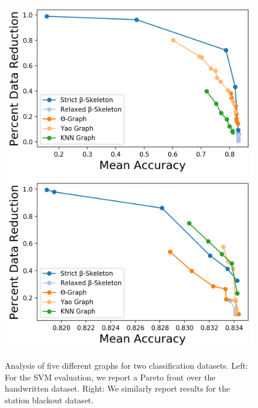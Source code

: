 \begin{figure}
    \includegraphics[width=0.48\linewidth]{figs/chap7/pareto_letters.png}
    \includegraphics[width=0.48\linewidth]{figs/chap7/pareto_sbo.png}
    \caption{Analysis of five different graphs for two classification datasets.
    Left: For the SVM evaluation, we report a Pareto front over the handwritten dataset.
    Right: We similarly report results for the station blackout dataset.}
    \label{fig:graph_svm}
\end{figure}